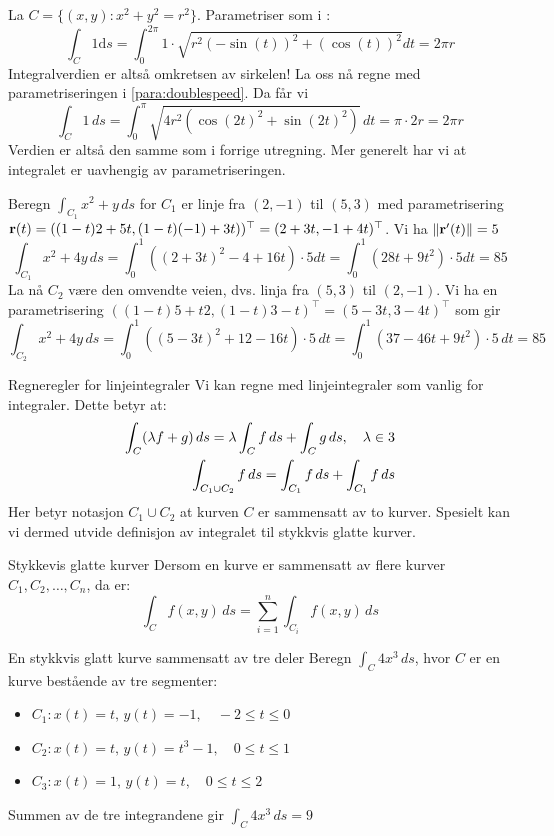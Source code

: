 \begin{eks}{}
La $C = \{(x,y) \colon x^2+y^2 = r^2\}$. Parametriser som i :
\[\int_C 1 \mathrm{d}s =\int_0^{2\pi} 1\cdot \sqrt{r^2 (-\sin(t))^2 + (\cos (t))^2}dt = 2\pi r \]
Integralverdien er altså omkretsen av sirkelen! La oss nå regne med parametriseringen i \eqref{para:doublespeed}. Da får vi
\[\int_C 1\, d s = \int_0^{\pi} \sqrt{4r^2(\cos (2t)^2+\sin (2t)^2)}\, dt = \pi \cdot 2r = 2\pi r\]
Verdien er altså den samme som i forrige utregning. Mer generelt har vi at integralet er uavhengig av parametriseringen.
\end{eks}


\begin{eks}{}
Beregn $\int_{C_1} x^2+y\, ds$ for $C_1$ er linje fra $(2,-1)$ til $(5,3)$ med parametrisering $\mathbf{r}(t)=((1-t)2+5t, (1-t)(-1)+3t))^\top=(2+3t,-1+4t)^\top$. Vi ha $\lVert \mathbf{r}'(t)\rVert = 5$
\[\int_{C_1} x^2+4y\, ds = \int_0^1 ((2+3t)^2-4+16t)\cdot 5 dt =\int_0^1 (28t+9t^2)\cdot 5 dt = 85\]
La nå $C_2$ være den omvendte veien, dvs. linja fra $(5,3)$ til $(2,-1)$. Vi ha en parametrisering $((1-t)5+t2,(1-t)3-t)^\top=(5-3t,3-4t)^\top$ som gir 
\[\int_{C_2} x^2+4y\, ds = \int_0^1 ((5-3t)^2+12-16t)\cdot 5\, dt= \int_0^1 (37-46t+9t^2)\cdot 5\, dt= 85\]
\end{eks}

\begin{oppsum}{Regneregler for linjeintegraler}
  Vi kan regne med linjeintegraler som vanlig for integraler. Dette betyr at:
  \begin{align}
  \int_C (\lambda f+g)\, ds = \lambda \int_C f \, ds + \int_C g \, ds, \quad \lambda \in 3 \label{lin_int_linear}\\
  \int_{C_1 \cup C_2} f \, ds = \int_{C_1} f \, ds + \int_{C_1} f \, ds \label{lin_int_add}
  \end{align}
  Her betyr notasjon $C_1\cup C_2$ at kurven $C$ er sammensatt av to kurver. Spesielt kan vi dermed utvide definisjon av integralet til stykkvis glatte kurver.
\end{oppsum}
\begin{rem}{Stykkevis glatte kurver}
Dersom en kurve er sammensatt av flere kurver \( C_1, C_2, \ldots, C_n \), da er:
\[
\int_C f(x, y)\, ds = \sum_{i=1}^n \int_{C_i} f(x, y)\, ds
\]
\end{rem}

\begin{eks}{En stykkvis glatt kurve sammensatt av tre deler}
Beregn \( \int_C 4x^3\, ds \), hvor \( C \) er en kurve bestående av tre segmenter:
\begin{itemize}
    \item \( C_1: x(t) = t,\, y(t) = -1,\quad -2 \leq t \leq 0 \)
    \item \( C_2: x(t) = t,\, y(t) = t^3 - 1,\quad 0 \leq t \leq 1 \)
    \item \( C_3: x(t) = 1,\, y(t) = t,\quad 0 \leq t \leq 2 \)
\end{itemize}
Summen av de tre integrandene gir \( \int_C 4x^3\, ds = 9 \)
\end{eks}

